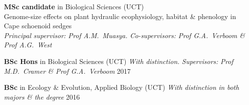 \begin{hangparas}{2em}{1}

\textbf{MSc candidate} in Biological Sciences {\small (UCT)}                  \\
  \hspace{2em} Genome-size effects on plant hydraulic ecophysiology,
    habitat \& phenology in Cape schoenoid sedges                             \\
  \hspace{2em} {\small \textit{Principal supervisor: Prof A.M.~Muasya.
    Co-supervisors: Prof G.A.~Verboom \& Prof A.G.~West}}

\textbf{BSc Hons} in Biological Sciences
  {\small (UCT) \textit{With distinction.
  Supervisors: Prof M.D.~Cramer \& Prof G.A.~Verboom}}      \hfill {\small 2017}

\textbf{BSc} in Ecology \& Evolution, Applied Biology
  {\small (UCT) \textit{With distinction in both majors \& the degree}}
                                                            \hfill {\small 2016}

\end{hangparas}
